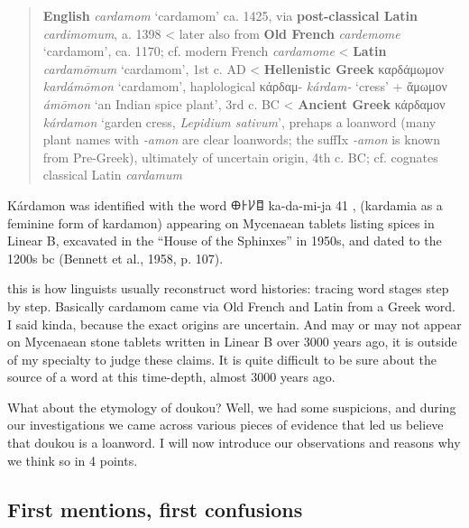 \documentclass[12pt]{article}
\begin{document}
\begin{quote}
    \textbf{English} \textit{cardamom} `cardamom' ca. 1425, via \textbf{post-classical Latin} \textit{cardimomum}, a. 1398
    < later also from \textbf{Old French} \textit{cardemome} `cardamom', ca. 1170; cf. modern French \textit{cardamome}
    < \textbf{Latin} \textit{cardamōmum} `cardamom', 1st c. AD
    < \textbf{Hellenistic Greek} {καρδάμωμον} \textit{kardámōmon} `cardamom', haplological κάρδαμ- \textit{kárdam-} `cress' + ἄμωμον \textit{ámōmon} `an Indian spice plant', 3rd c. BC
    < \textbf{Ancient Greek} {κάρδαμον} \textit{kárdamon} `garden cress, \textit{Lepidium sativum}', prehaps a loanword (many plant names with \textit{-amon} are clear loanwords; the suffIx \textit{-amon} is known from Pre-Greek), ultimately of uncertain origin, 4th c. BC; cf. cognates classical Latin \textit{cardamum}
    \parencites[s.v. cardamom]{oed}[s.v. cardamome]{tlfi}[s.v. cardamomum]{lewis_1879_latin}[s.v. καρδάμωμον]{liddell_1940_greekenglish}[s.v. κάρδαμον]{liddell_1940_greekenglish}[644]{beekes_2010_etymological}
\end{quote}

Kárdamon was identified with the word 𐀏𐀅𐀖𐀊 ka-da-mi-ja 41 , (kardamia as a feminine form of kardamon) appearing on Mycenaean tablets listing spices in Linear B, excavated in the “House of the Sphinxes” in 1950s, and dated to the 1200s bc (Bennett et al., 1958, p. 107).



this is how linguists usually reconstruct word histories: tracing word stages step by step. Basically cardamom came via Old French and Latin from a Greek word. I said kinda, because the exact origins are uncertain. And may or may not appear on Mycenaean stone tablets written in Linear B over 3000 years ago, it is outside of my specialty to judge these claims. It is quite difficult to be sure about the source of a word at this time-depth, almost 3000 years ago.

What about the etymology of doukou? Well, we had some suspicions, and during our investigations we came across various pieces of evidence that led us believe that doukou is a loanword. I will now introduce our observations and reasons why we think so in 4 points.

\subsection{First mentions, first confusions}
\end{document}
